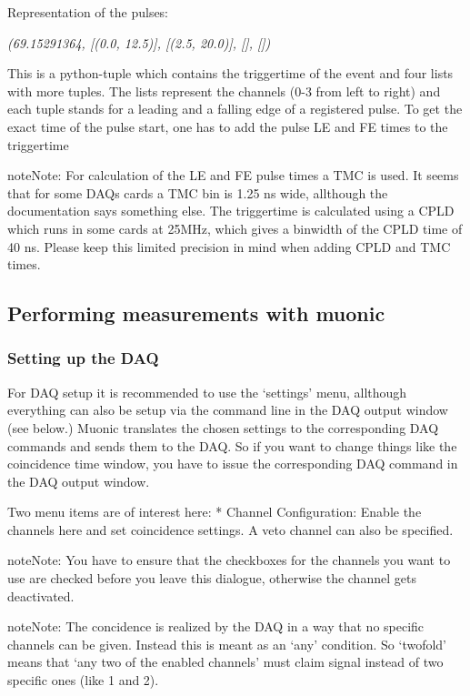 \documentclass[letterpaper,10pt,english]{sphinxmanual}
\begin{document}
Representation of the pulses:

\emph{(69.15291364, {[}(0.0, 12.5){]}, {[}(2.5, 20.0){]}, {[}{]}, {[}{]})}

This is a python-tuple which contains the triggertime of the event and four lists with more tuples. The lists represent the channels (0-3 from left to right) and each tuple stands for a leading and a falling edge of a registered pulse. To get the exact time of the pulse start, one has to add the pulse LE and FE times to the triggertime

\begin{notice}{note}{Note:}
For calculation of the LE and FE pulse times a TMC is used. It seems that for some DAQs cards a TMC bin is 1.25 ns wide, allthough the documentation says something else.
The triggertime is calculated using a CPLD which runs in some cards at 25MHz, which gives a binwidth of the CPLD time of 40 ns.
Please keep this limited precision in mind when adding CPLD and TMC times.
\end{notice}


\subsection{Performing measurements with muonic}
\label{tutorial:performing-measurements-with-muonic}

\subsubsection{Setting up the DAQ}
\label{tutorial:setting-up-the-daq}
For DAQ setup it is recommended to use the `settings' menu, allthough everything can also be setup via the command line in the DAQ output window (see below.)
Muonic translates the chosen settings to the corresponding DAQ commands and sends them to the DAQ. So if you want to change things like the coincidence time window, you have to issue the corresponding DAQ command in the DAQ output window.

Two menu items are of interest here:
* Channel Configuration: Enable the channels here and set coincidence settings. A veto channel can also be specified.

\begin{notice}{note}{Note:}
You have to ensure that the checkboxes for the channels you want to use are checked before you leave this dialogue, otherwise the channel gets deactivated.
\end{notice}

\begin{notice}{note}{Note:}
The concidence is realized by the DAQ in a way that no specific channels can be given. Instead this is meant as an `any' condition.
So `twofold' means that `any two of the enabled channels' must claim signal instead of two specific ones (like 1 and 2).
\end{notice}
\end{document}
